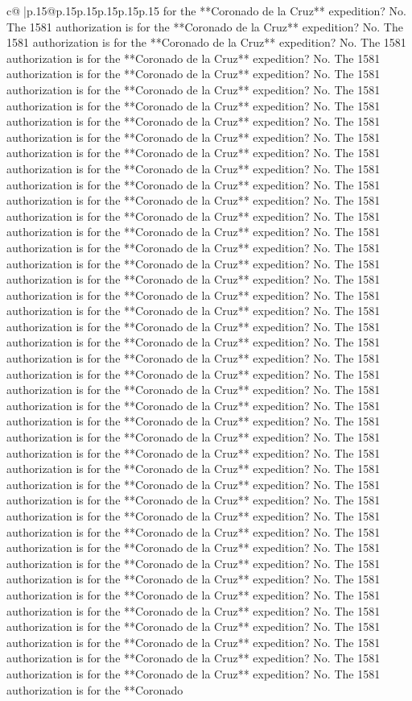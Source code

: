 \documentclass{article}
\begin{document}
{\begin{supertabular}{c@{$\;$}|p{.15\linewidth}@{}p{.15\linewidth}p{.15\linewidth}p{.15\linewidth}p{.15\linewidth}p{.15\linewidth}}
{{{for the **Coronado de la Cruz** expedition? No. The 1581 authorization is for the **Coronado de la Cruz** expedition? No. The 1581 authorization is for the **Coronado de la Cruz** expedition? No. The 1581 authorization is for the **Coronado de la Cruz** expedition? No. The 1581 authorization is for the **Coronado de la Cruz** expedition? No. The 1581 authorization is for the **Coronado de la Cruz** expedition? No. The 1581 authorization is for the **Coronado de la Cruz** expedition? No. The 1581 authorization is for the **Coronado de la Cruz** expedition? No. The 1581 authorization is for the **Coronado de la Cruz** expedition? No. The 1581 authorization is for the **Coronado de la Cruz** expedition? No. The 1581 authorization is for the **Coronado de la Cruz** expedition? No. The 1581 authorization is for the **Coronado de la Cruz** expedition? No. The 1581 authorization is for the **Coronado de la Cruz** expedition? No. The 1581 authorization is for the **Coronado de la Cruz** expedition? No. The 1581 authorization is for the **Coronado de la Cruz** expedition? No. The 1581 authorization is for the **Coronado de la Cruz** expedition? No. The 1581 authorization is for the **Coronado de la Cruz** expedition? No. The 1581 authorization is for the **Coronado de la Cruz** expedition? No. The 1581 authorization is for the **Coronado de la Cruz** expedition? No. The 1581 authorization is for the **Coronado de la Cruz** expedition? No. The 1581 authorization is for the **Coronado de la Cruz** expedition? No. The 1581 authorization is for the **Coronado de la Cruz** expedition? No. The 1581 authorization is for the **Coronado de la Cruz** expedition? No. The 1581 authorization is for the **Coronado de la Cruz** expedition? No. The 1581 authorization is for the **Coronado de la Cruz** expedition? No. The 1581 authorization is for the **Coronado de la Cruz** expedition? No. The 1581 authorization is for the **Coronado de la Cruz** expedition? No. The 1581 authorization is for the **Coronado de la Cruz** expedition? No. The 1581 authorization is for the **Coronado de la Cruz** expedition? No. The 1581 authorization is for the **Coronado de la Cruz** expedition? No. The 1581 authorization is for the **Coronado de la Cruz** expedition? No. The 1581 authorization is for the **Coronado de la Cruz** expedition? No. The 1581 authorization is for the **Coronado de la Cruz** expedition? No. The 1581 authorization is for the **Coronado de la Cruz** expedition? No. The 1581 authorization is for the **Coronado de la Cruz** expedition? No. The 1581 authorization is for the **Coronado de la Cruz** expedition? No. The 1581 authorization is for the **Coronado de la Cruz** expedition? No. The 1581 authorization is for the **Coronado de la Cruz** expedition? No. The 1581 authorization is for the **Coronado de la Cruz** expedition? No. The 1581 authorization is for the **Coronado de la Cruz** expedition? No. The 1581 authorization is for the **Coronado de la Cruz** expedition? No. The 1581 authorization is for the **Coronado de la Cruz** expedition? No. The 1581 authorization is for the **Coronado de la Cruz** expedition? No. The 1581 authorization is for the **Coronado }}}
\end{supertabular}}
\end{document}
